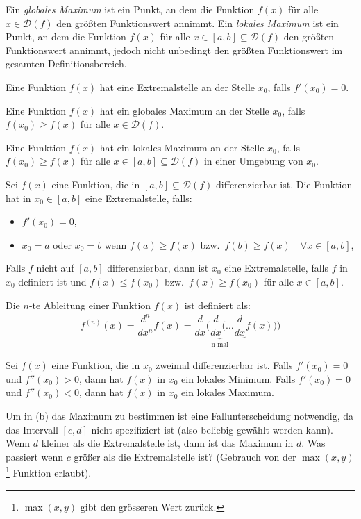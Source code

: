 \documentclass[12pt]{article}
\newenvironment{definition}[2][Definition]{\begin{trivlist}
        \item[\hskip \labelsep {\bfseries #1}\hskip \labelsep {\bfseries #2.}]}{\flushright{$\square$}\end{trivlist}}
\newenvironment{lemma}[2][Theorem]{\begin{trivlist}
        \item[\hskip \labelsep {\bfseries #1}\hskip \labelsep {\bfseries #2.}]}{\flushright{$\square$}\end{trivlist}}
\newenvironment{problem}[2][\textcolor{blue}{Tipps \& Tricks zu}]{\begin{trivlist}
        \item[\hskip \labelsep {\bfseries #1}\hskip \labelsep {\bfseries \textcolor{blue}{#2}.}]}{\end{trivlist}}
\begin{document}
\begin{problem}{2}
Ein \textit{globales Maximum} ist ein Punkt, an dem die Funktion $f(x)$ für alle $x\in\mathcal{D}(f)$ den größten Funktionswert annimmt.
Ein \textit{lokales Maximum} ist ein Punkt, an dem die Funktion $f(x)$ für alle $x\in[a,b]\subseteq\mathcal{D}(f)$ den größten Funktionswert annimmt, jedoch nicht unbedingt den größten Funktionswert im gesamten Definitionsbereich.
\begin{definition}{[Extremalstellen]}
    Eine Funktion $f(x)$ hat eine Extremalstelle an der Stelle $x_0$, falls $f'(x_0)=0$.
\end{definition}
\begin{definition}{[Globales Maximum]}
    Eine Funktion $f(x)$ hat ein globales Maximum an der Stelle $x_0$, falls $f(x_0)\geq f(x)$ für alle $x\in\mathcal{D}(f)$.
\end{definition}
\begin{definition}{[Lokales Maximum]}
    Eine Funktion $f(x)$ hat ein lokales Maximum an der Stelle $x_0$, falls $f(x_0)\geq f(x)$ für alle $x\in[a,b]\subseteq\mathcal{D}(f)$ in einer Umgebung von $x_0$.
\end{definition}
\begin{lemma}{[Bedingungen für Extremalstellen]}
    Sei $f(x)$ eine Funktion, die in $[a,b]\subseteq\mathcal{D}(f)$ differenzierbar ist.
    Die Funktion hat in $x_0\in[a,b]$ eine Extremalstelle, falls:
    \begin{itemize}
        \item $f'(x_0)=0$,
        \item $x_0=a$ oder $x_0=b$ wenn $f(a)\geq f(x)$ bzw.\ $f(b)\geq f(x) \quad\forall{}x\in[a,b]$,
    \end{itemize}
    Falls $f$ nicht auf $[a,b]$ differenzierbar, dann ist $x_0$ eine Extremalstelle, falls $f$ in $x_0$ definiert ist und $f(x)\leq f(x_0)$ bzw.\ $f(x)\geq f(x_0)$ für alle $x\in[a,b]$.
\end{lemma}
\begin{definition}{[Höhere Ableitungen]}
    Die $n$-te Ableitung einer Funktion $f(x)$ ist definiert als:
    \begin{align*}
        f^{(n)}(x)=\dfrac{d^n}{dx^n}f(x)=\underbrace{\dfrac{d}{dx}(\dfrac{d}{dx}(\ldots\dfrac{d}{dx}}_{\text{n mal}}f(x)))
    \end{align*}
\end{definition}
\begin{definition}{[Maxima und Minima mit höheren Ableitungen]}
    Sei $f(x)$ eine Funktion, die in $x_0$ zweimal differenzierbar ist. Falls $f'(x_0)=0$ und $f''(x_0)>0$, dann hat $f(x)$ in $x_0$ ein lokales Minimum. Falls $f'(x_0)=0$ und $f''(x_0)<0$, dann hat $f(x)$ in
    $x_0$ ein lokales Maximum.
\end{definition}
Um in (b) das Maximum zu bestimmen ist eine Fallunterscheidung notwendig, da das Intervall $[c,d]$ nicht spezifiziert ist (also beliebig gewählt werden kann).
Wenn $d$ kleiner als die Extremalstelle ist, dann ist das Maximum in $d$. Was passiert wenn $c$ größer als die Extremalstelle ist? (Gebrauch von der $\max(x,y)$\footnote{$\max(x,y)$ gibt den grösseren Wert zurück.} Funktion erlaubt).
\end{problem}
\end{document}
